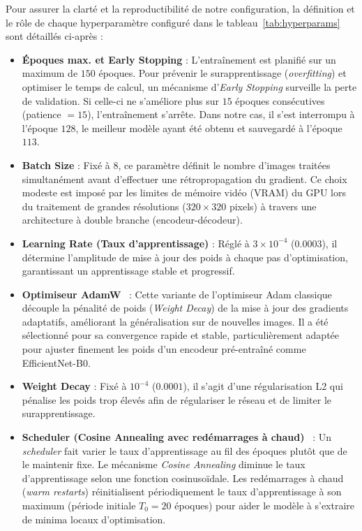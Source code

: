 Pour assurer la clarté et la reproductibilité de notre configuration, la définition et le rôle de chaque hyperparamètre configuré dans le tableau~\ref{tab:hyperparams} sont détaillés ci-après :
\begin{itemize}[leftmargin=1.8em, itemsep=6pt]
  \item \textbf{Époques max. et Early Stopping} : L'entraînement est planifié sur un maximum de $150$ époques. Pour prévenir le surapprentissage (\textit{overfitting}) et optimiser le temps de calcul, un mécanisme d'\textit{Early Stopping} surveille la perte de validation. Si celle-ci ne s'améliore plus sur $15$ époques consécutives (patience $= 15$), l'entraînement s'arrête. Dans notre cas, il s'est interrompu à l'époque $128$, le meilleur modèle ayant été obtenu et sauvegardé à l'époque $113$.
  \item \textbf{Batch Size} : Fixé à $8$, ce paramètre définit le nombre d'images traitées simultanément avant d'effectuer une rétropropagation du gradient. Ce choix modeste est imposé par les limites de mémoire vidéo (VRAM) du GPU lors du traitement de grandes résolutions ($320\times320$ pixels) à travers une architecture à double branche (encodeur-décodeur).
  \item \textbf{Learning Rate (Taux d'apprentissage)} : Réglé à $3\times10^{-4}$ ($0.0003$), il détermine l'amplitude de mise à jour des poids à chaque pas d'optimisation, garantissant un apprentissage stable et progressif.
  \item \textbf{Optimiseur AdamW}~\cite{loshchilov2019adamw} : Cette variante de l'optimiseur Adam classique découple la pénalité de poids (\textit{Weight Decay}) de la mise à jour des gradients adaptatifs, améliorant la généralisation sur de nouvelles images. Il a été sélectionné pour sa convergence rapide et stable, particulièrement adaptée pour ajuster finement les poids d'un encodeur pré-entraîné comme EfficientNet-B0.
  \item \textbf{Weight Decay} : Fixé à $10^{-4}$ ($0.0001$), il s'agit d'une régularisation L2 qui pénalise les poids trop élevés afin de régulariser le réseau et de limiter le surapprentissage.
  \item \textbf{Scheduler (Cosine Annealing avec redémarrages à chaud)}~\cite{loshchilov2017sgdr} : Un \textit{scheduler} fait varier le taux d'apprentissage au fil des époques plutôt que de le maintenir fixe. Le mécanisme \textit{Cosine Annealing} diminue le taux d'apprentissage selon une fonction cosinusoïdale. Les redémarrages à chaud (\textit{warm restarts}) réinitialisent périodiquement le taux d'apprentissage à son maximum (période initiale $T_0 = 20$ époques) pour aider le modèle à s'extraire de minima locaux d'optimisation.

\end{itemize}
